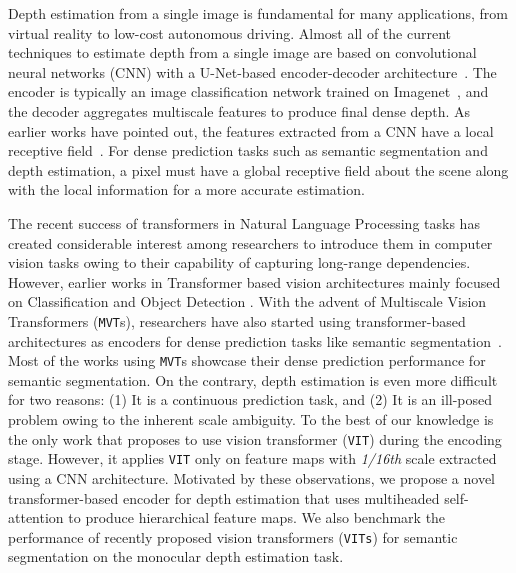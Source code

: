\documentclass{article}
\newcommand{\ViT}{\texttt{VIT}\xspace}
\newcommand{\ViTs}{\texttt{VITs}\xspace}
\newcommand{\MVTs}{\texttt{MVT}s\xspace}
\begin{document}
Depth estimation from a single image is fundamental for many applications, from virtual reality to low-cost autonomous driving. Almost all of the current techniques to estimate depth from a single image are based on convolutional neural networks (CNN) with a U-Net-based encoder-decoder architecture~\cite{ eigen, DORN, bts, DAV, chenetal, goddard, Depth2015Liu, Kuznietsov_2017_CVPR, ganetal}. The encoder is typically an image classification network trained on Imagenet~\cite{imagenet}, and the decoder aggregates multiscale features to produce final dense depth. As earlier works have pointed out, the features extracted from a CNN have a local receptive field~\cite{segformer, pvtv1}. For dense prediction tasks such as semantic segmentation and depth estimation, a pixel must have a global receptive field about the scene along with the local information for a more accurate estimation.




The recent success of transformers in Natural Language Processing tasks has created considerable interest among researchers to introduce them in computer vision tasks owing to their capability of capturing long-range dependencies. However, earlier works in Transformer based vision architectures mainly focused on Classification and Object Detection \cite{vit, detr}. With the advent of Multiscale Vision Transformers (\MVTs), researchers have also started using transformer-based architectures as encoders for dense prediction tasks like semantic segmentation~\cite{pvtv1, swin, segformer, twins, mpvit}. Most of the works using \MVTs showcase their dense prediction performance for semantic segmentation. On the contrary, depth estimation is even more difficult for two reasons: (1) It is a continuous prediction task, and (2) It is an ill-posed problem owing to the inherent scale ambiguity. To the best of our knowledge \cite{dense} is the only work that proposes to use vision transformer (\ViT) during the encoding stage. However, it applies \ViT only on feature maps with \textit{1/16th} scale extracted using a CNN architecture. Motivated by these observations, we propose a novel transformer-based encoder for depth estimation that uses multiheaded self-attention to produce hierarchical feature maps. We also benchmark the performance of recently proposed vision transformers (\ViTs) for semantic segmentation on the monocular depth estimation task. 
\end{document}
